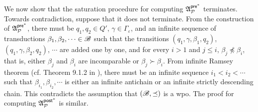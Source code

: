We now show that the saturation procedure for computing ${\mathfrak{A} }^{{\mathsf{pre} }^*}_{{\mathcal{P} }}$ terminates. 
%
Towards contradiction, suppose that 
it does not terminate. From the construction of ${\mathfrak{A} }^{{\mathsf{pre} }^*}_{{\mathcal{P} }}$, there must be $q_1, q_2 \in Q'$, $\gamma \in \Gamma_\varepsilon$, and an infinite sequence of transductions $\beta_1, \beta_2, \cdots \in {\mathscr{B} }$ such that the transitions $(q_1, \gamma, \beta_1, q_2) $, $(q_1, \gamma, \beta_2, q_2) $, $\cdots$ are added one by one,  and for every $i > 1$ and $j \le i$, $\beta_j \not \preceq \beta_i$,  that is, either $\beta_j$ and $\beta_i$ are incomparable or $\beta_j \succ \beta_i$. From infinite Ramsey theorem (cf. Theorem 9.1.2 in \cite{Rein00}), there must be an infinite sequence $i_1 < i_2 < \cdots$ such that $\beta_{i_1}, \beta_{i_2}, \cdots$ is either an infinite antichain or an infinite strictly descending chain. This contradicts the assumption that $({\mathscr{B} }, \preceq)$ is a wpo. 
The proof for computing ${\mathfrak{A} }^{{\mathsf{post} }^*}_{{\mathcal{P} }}$ is similar.


